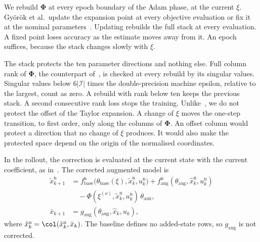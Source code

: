 We rebuild $\boldsymbol\Phi$ at every epoch boundary of the Adam phase, at
the current $\xi$.
Gy\"or\"ok et al.\ update the expansion point at every objective evaluation or
fix it at the nominal parameters~\cite[Sec.~4]{gyorok2025l4dc}.
Updating rebuilds the full stack at every evaluation.
A fixed point loses accuracy as the estimate moves away from it.
An epoch suffices, because the stack changes slowly with $\xi$.

The stack protects the ten parameter directions and nothing else.
Full column rank of $\boldsymbol\Phi$, the counterpart
of~\cite[Assumption~1]{gyorok2026obc}, is checked at every rebuild by its
singular values.
Singular values below $6|\mathcal I|$ times the double-precision machine
epsilon, relative to the largest, count as zero.
A rebuild with rank below ten keeps the previous stack.
A second consecutive rank loss stops the training.
Unlike~\cite[Eq.~(18)]{gyorok2025l4dc}, we do not protect the offset of the
Taylor expansion.
A change of $\xi$ moves the one-step transition, to first order, only along
the columns of $\boldsymbol\Phi$.
An offset column would protect a direction that no change of $\xi$ produces.
It would also make the protected space depend on the origin of the
normalised coordinates.

In the rollout, the correction is evaluated at the current state with the
current coefficient, as in~\cite[Eq.~(13)]{gyorok2026obc}.
The corrected augmented model is
\begin{equation}
\begin{aligned}
 \tilde x^{\mathrm n}_{k+1}
 &=f^{\mathrm n}_{\mathrm{base}}\bigl(\theta_{\mathrm{base}}(\xi),\tilde x^{\mathrm n}_k,u^{\mathrm n}_k\bigr)
  +f^{\mathrm n}_{\mathrm{aug}}(\theta_{\mathrm{aug}},\hat x^{\mathrm n}_k,u^{\mathrm n}_k)\\
 &\quad-\Phi(\xi^{(\nu)},\tilde x^{\mathrm n}_k,u^{\mathrm n}_k)\,\theta_{\mathrm{aux}},\\
 \bar x_{k+1}&=g_{\mathrm{aug}}(\theta_{\mathrm{aug}},\hat x_k,u_k),
\end{aligned}
\label{eq:obc_model}
\end{equation}
where $\hat x^{\mathrm n}_k=\col(\tilde x^{\mathrm n}_k,\bar x_k)$.
The baseline defines no added-state rows, so $g_{\mathrm{aug}}$ is not
corrected.

